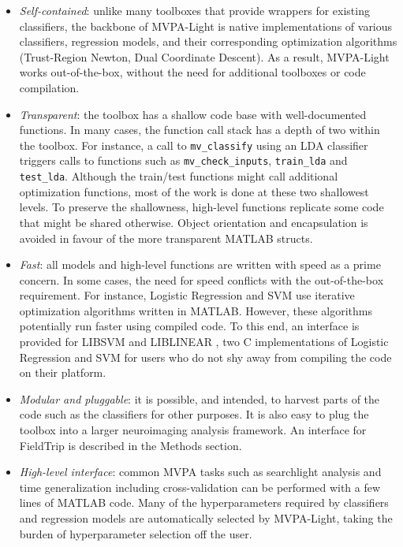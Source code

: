 \documentclass[utf8]{frontiersSCNS} %
\begin{document}
\begin{itemize}
\item \textit{Self-contained}: unlike many toolboxes that provide wrappers for existing classifiers, the backbone of MVPA-Light is  native implementations of various classifiers, regression models, and their corresponding optimization algorithms (Trust-Region Newton, Dual Coordinate Descent). As a result, MVPA-Light works out-of-the-box, without the need for additional toolboxes or  code compilation.
\item \textit{Transparent}: the toolbox has a shallow code base with well-documented functions. In many cases, the function call stack has a depth of two within the toolbox. For instance, a call to \texttt{mv\_classify} using an LDA classifier triggers calls to functions such as  \texttt{mv\_check\_inputs}, \texttt{train\_lda} and \texttt{test\_lda}. Although the train/test functions might call additional optimization functions, most of the work is done at these two shallowest levels. To preserve the shallowness, high-level functions replicate some code that might be shared otherwise. Object orientation and encapsulation is avoided in favour of the more transparent MATLAB structs.
\item \textit{Fast}: all models and high-level functions are written with speed as a prime concern. In some cases, the need for speed conflicts with the out-of-the-box requirement. For instance, Logistic Regression and SVM use iterative optimization algorithms written in MATLAB. However, these algorithms potentially run faster using compiled code. To this end, an interface is provided for LIBSVM \citep{Chang2011LIBSVM:Machines} and LIBLINEAR \citep{Fan2008}, two C implementations of Logistic Regression and SVM for users who do not shy away from compiling the code on their platform.
\item \textit{Modular and pluggable}: it is possible, and intended, to harvest parts of the code such as the classifiers for other purposes. It is also easy to plug the toolbox into a larger neuroimaging analysis framework. An interface for FieldTrip \citep{Oostenveld2011} is described in the Methods section.
\item \textit{High-level interface}: common MVPA tasks such as searchlight analysis and time generalization including cross-validation can be performed with a few lines of MATLAB code. Many of the hyperparameters required by classifiers and regression models are automatically selected by MVPA-Light, taking the burden of hyperparameter selection off the user.
\end{itemize}
\end{document}

